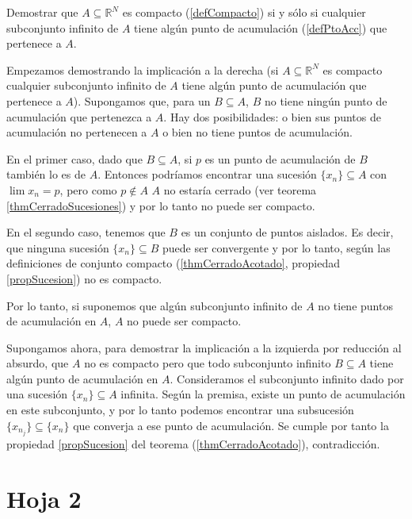 \begin{problem}[7] Demostrar que $A⊆ℝ^N$ es compacto (\ref{defCompacto}) si y sólo si cualquier subconjunto infinito de $A$ tiene algún punto de acumulación (\ref{defPtoAcc}) que pertenece a $A$.

\solution

Empezamos demostrando la implicación a la derecha (si $A⊆ℝ^N$ es compacto cualquier subconjunto infinito de $A$ tiene algún punto de acumulación que pertenece a $A$). Supongamos que, para un $B⊆A$, $B$ no tiene ningún punto de acumulación que pertenezca a $A$. Hay dos posibilidades: o bien sus puntos de acumulación no pertenecen a $A$ o bien no tiene puntos de acumulación.

En el primer caso, dado que $B⊆A$, si $p$ es un punto de acumulación de $B$ también lo es de $A$. Entonces podríamos encontrar una sucesión $\{x_n\} ⊆ A$ con $\lim x_n = p$, pero como $p\notin A$ $A$ no estaría cerrado (ver teorema \ref{thmCerradoSucesiones}) y por lo tanto no puede ser compacto.

En el segundo caso, tenemos que $B$ es un conjunto de puntos aislados. Es decir, que ninguna sucesión $\{x_n\} ⊆ B$ puede ser convergente y por lo tanto, según las definiciones de conjunto compacto (\ref{thmCerradoAcotado}, propiedad \ref{propSucesion}) no es compacto.

Por lo tanto, si suponemos que algún subconjunto infinito de $A$ no tiene puntos de acumulación en $A$, $A$ no puede ser compacto. 

Supongamos ahora, para demostrar la implicación a la izquierda por reducción al absurdo, que $A$ no es compacto pero que todo subconjunto infinito $B⊆A$ tiene algún punto de acumulación en $A$. Consideramos el subconjunto infinito dado por una sucesión $\{x_n\} ⊆ A$ infinita. Según la premisa, existe un punto de acumulación en este subconjunto, y por lo tanto podemos encontrar una subsucesión $\{x_{n_j}\}⊆\{x_n\}$ que converja a ese punto de acumulación. Se cumple por tanto la propiedad \ref{propSucesion} del teorema (\ref{thmCerradoAcotado}), contradicción.


\end{problem}

\section{Hoja 2}


